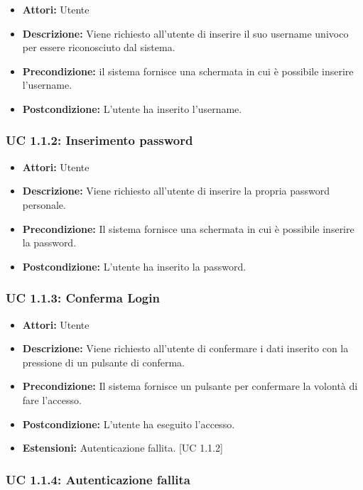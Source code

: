 \begin{itemize}
    \item \textbf{Attori:} Utente
    \item \textbf{Descrizione:} Viene richiesto all'utente di inserire il suo username univoco per essere riconosciuto dal sistema.
    \item \textbf{Precondizione:} il sistema fornisce una schermata in cui è possibile inserire l’username.
    \item \textbf{Postcondizione:} L'utente ha inserito l'username.
\end{itemize}

\subsubsection{UC 1.1.2: Inserimento password}

\begin{itemize}
    \item \textbf{Attori:} Utente
    \item \textbf{Descrizione:} Viene richiesto all'utente di inserire la propria password personale.
    \item \textbf{Precondizione:} Il sistema fornisce una schermata in cui è possibile inserire la password.
    \item \textbf{Postcondizione:} L'utente ha inserito la password.
\end{itemize}

\subsubsection{UC 1.1.3: Conferma Login}

\begin{itemize}
    \item \textbf{Attori:} Utente
    \item \textbf{Descrizione:} Viene richiesto all'utente di confermare i dati inserito con la pressione di un pulsante di conferma.
    \item \textbf{Precondizione:} Il sistema fornisce un pulsante per confermare la volontà di fare l'accesso.
    \item \textbf{Postcondizione:} L'utente ha eseguito l'accesso.
    \item \textbf{Estensioni:} Autenticazione fallita. [UC 1.1.2]
\end{itemize}

\subsubsection{UC 1.1.4: Autenticazione fallita}

